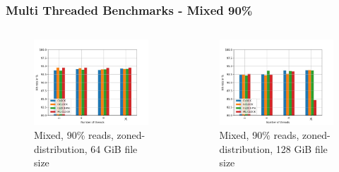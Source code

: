 \documentclass[
	aspectratio=169,
	compress,
]{beamer}
\newcommand{\navframetitle}[1]{\frametitle{#1\hfill{\footnotesize\lastsection{}}}}
\begin{document}
\begin{frame}[fragile]
	\navframetitle{Multi Threaded Benchmarks - Mixed 90\%}

	\begin{columns}
		\begin{column}{0.5\textwidth}
			\begin{figure}[ht]
    			\centering
    			\includegraphics[width=\textwidth]{multi_64_gb_rw_90to10_zoned.jpg}
        		\caption{Mixed, 90\% reads, zoned-distribution, 64 GiB file size}
			\end{figure}
		\end{column}
		\begin{column}{0.5\textwidth}
			\begin{figure}[ht]
    			\centering
    			\includegraphics[width=\textwidth]{multi_128_gb_rw_90to10_zoned.jpg}
        		\caption{Mixed, 90\% reads, zoned-distribution, 128 GiB file size}
			\end{figure}			
		\end{column}
	\end{columns}
\end{frame}
\end{document}
